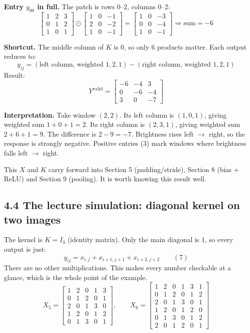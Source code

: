 \textbf{Entry $y_{00}$ in full.} The patch is rows 0--2, columns 0--2:
\[
\begin{bmatrix}1&2&3\\0&1&2\\1&0&1\end{bmatrix} \odot \begin{bmatrix}1&0&-1\\2&0&-2\\1&0&-1\end{bmatrix} = \begin{bmatrix}1&0&-3\\0&0&-4\\1&0&-1\end{bmatrix} \Rightarrow \text{sum} = -6
\]

\textbf{Shortcut.} The middle column of $K$ is 0, so only 6 products matter. Each output reduces to:
\[
y_{ij} = (\text{left column, weighted } 1,2,1) - (\text{right column, weighted } 1,2,1)
\]
Result:
\[
Y^{\text{valid}} = \begin{bmatrix}-6&-4&3\\0&-6&-4\\3&0&-7\end{bmatrix}
\]

\textbf{Interpretation.} Take window $(2,2)$. Its left column is $(1,0,1)$, giving weighted sum $1+0+1=2$. Its right column is $(2,3,1)$, giving weighted sum $2+6+1=9$. The difference is $2-9=-7$. Brightness rises left $\to$ right, so the response is strongly negative. Positive entries (3) mark windows where brightness falls left $\to$ right.

This $X$ and $K$ carry forward into Section 5 (padding/stride), Section 8 (bias + ReLU) and Section 9 (pooling). It is worth knowing this result well.

\subsection*{4.4 The lecture simulation: diagonal kernel on two images}

The kernel is $K = I_3$ (identity matrix). Only the main diagonal is 1, so every output is just:
\[
y_{ij} = x_{i,j} + x_{i+1,j+1} + x_{i+2,j+2} \qquad (7)
\]
There are no other multiplications. This makes every number checkable at a glance, which is the whole point of the example.
\[
X_5 = \begin{bmatrix}1&2&0&1&3\\0&1&2&0&1\\2&0&1&3&0\\1&2&0&1&2\\0&1&3&0&1\end{bmatrix}, \qquad
X_6 = \begin{bmatrix}1&2&0&1&3&1\\0&1&2&0&1&2\\2&0&1&3&0&1\\1&2&0&1&2&0\\0&1&3&0&1&2\\2&0&1&2&0&1\end{bmatrix}
\]

